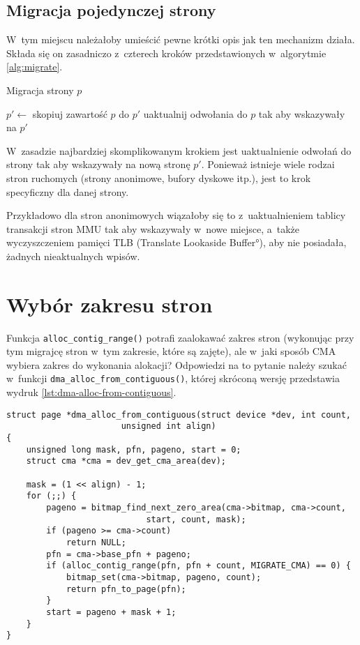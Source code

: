\subsection{Migracja pojedynczej strony}

W~tym miejscu należałoby umieścić pewne krótki opis jak ten mechanizm
działa.  Składa się on zasadniczo z~czterech kroków przedstawionych
w~algorytmie \ref{alg:migrate}.

\begin{algorithm}\label{alg:migrate}
\caption{Migracja strony $p$}
\begin{algorithmic}[1]
    \State $p' \gets$ 
    \State skopiuj zawartość $p$ do $p'$
    \State uaktualnij odwołania do $p$ tak aby wskazywały na $p'$
    \State {}
\EndProcedure
\end{algorithmic}
\end{algorithm}

W~zasadzie najbardziej skomplikowanym krokiem jest uaktualnienie
odwołań do strony tak aby wskazywały na nową stronę $p'$.  Ponieważ
istnieje wiele rodzai stron ruchomych (strony anonimowe, bufory
dyskowe itp.), jest to krok specyficzny dla danej strony.

Przykładowo dla stron anonimowych wiązałoby się to z~uaktualnieniem
tablicy transakcji stron MMU tak aby wskazywały w~nowe miejsce,
a~także wyczyszczeniem pamięci TLB (\ang{Translate Lookaside Buffer}),
aby nie posiadała, żadnych nieaktualnych wpisów.


\section{Wybór zakresu stron}

Funkcja \lstinline|alloc_contig_range()| potrafi zaalokawać zakres
stron (wykonując przy tym migrajcę stron w~tym zakresie, które są
zajęte), ale w~jaki sposób CMA wybiera zakres do wykonania alokacji?
Odpowiedzi na to pytanie należy szukać w~funkcji
\lstinline|dma_alloc_from_contiguous()|, której skróconą wersję
przedstawia wydruk \ref{lst:dma-alloc-from-contiguous}.

\begin{lstlisting}[float=tbhp,caption={Skrócony wydruk funkcji
    \lstinline|dma_alloc_from_contiguous()| z Linuksa
    3.5.},label=lst:dma-alloc-from-contiguous]
struct page *dma_alloc_from_contiguous(struct device *dev, int count,
				       unsigned int align)
{
	unsigned long mask, pfn, pageno, start = 0;
	struct cma *cma = dev_get_cma_area(dev);

	mask = (1 << align) - 1;
	for (;;) {
		pageno = bitmap_find_next_zero_area(cma->bitmap, cma->count,
						    start, count, mask);
		if (pageno >= cma->count)
			return NULL;
		pfn = cma->base_pfn + pageno;
		if (alloc_contig_range(pfn, pfn + count, MIGRATE_CMA) == 0) {
			bitmap_set(cma->bitmap, pageno, count);
			return pfn_to_page(pfn);
		}
		start = pageno + mask + 1;
	}
}
\end{lstlisting}

